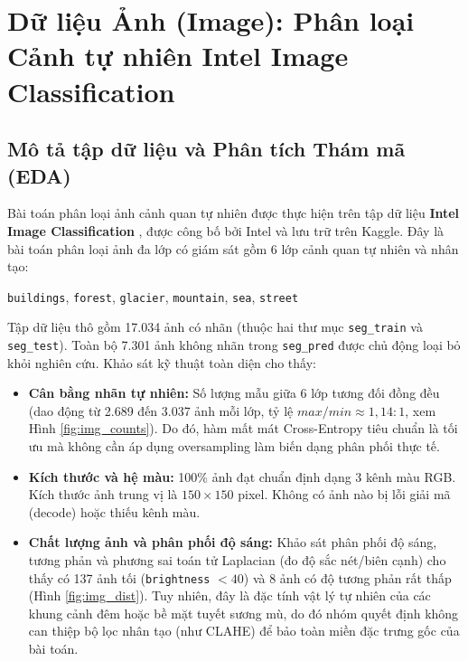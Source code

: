 \documentclass[a4paper,11pt]{article}
\begin{document}
\newpage
\section{Dữ liệu Ảnh (Image): Phân loại Cảnh tự nhiên Intel Image Classification}

\subsection{Mô tả tập dữ liệu và Phân tích Thám mã (EDA)}
Bài toán phân loại ảnh cảnh quan tự nhiên được thực hiện trên tập dữ liệu \textbf{Intel Image Classification} \cite{intel_dataset}, được công bố bởi Intel và lưu trữ trên Kaggle. Đây là bài toán phân loại ảnh đa lớp có giám sát gồm 6 lớp cảnh quan tự nhiên và nhân tạo:
\begin{center}
\texttt{buildings}, \texttt{forest}, \texttt{glacier}, \texttt{mountain}, \texttt{sea}, \texttt{street}
\end{center}

Tập dữ liệu thô gồm 17.034 ảnh có nhãn (thuộc hai thư mục \texttt{seg\_train} và \texttt{seg\_test}). Toàn bộ 7.301 ảnh không nhãn trong \texttt{seg\_pred} được chủ động loại bỏ khỏi nghiên cứu. Khảo sát kỹ thuật toàn diện cho thấy:
\begin{itemize}
    \item \textbf{Cân bằng nhãn tự nhiên:} Số lượng mẫu giữa 6 lớp tương đối đồng đều (dao động từ 2.689 đến 3.037 ảnh mỗi lớp, tỷ lệ $max/min \approx 1{,}14:1$, xem Hình \ref{fig:img_counts}). Do đó, hàm mất mát Cross-Entropy tiêu chuẩn là tối ưu mà không cần áp dụng oversampling làm biến dạng phân phối thực tế.
    \item \textbf{Kích thước và hệ màu:} 100\% ảnh đạt chuẩn định dạng 3 kênh màu RGB. Kích thước ảnh trung vị là $150 \times 150$ pixel. Không có ảnh nào bị lỗi giải mã (decode) hoặc thiếu kênh màu.
    \item \textbf{Chất lượng ảnh và phân phối độ sáng:} Khảo sát phân phối độ sáng, tương phản và phương sai toán tử Laplacian (đo độ sắc nét/biên cạnh) cho thấy có 137 ảnh tối (\texttt{brightness} $< 40$) và 8 ảnh có độ tương phản rất thấp (Hình \ref{fig:img_dist}). Tuy nhiên, đây là đặc tính vật lý tự nhiên của các khung cảnh đêm hoặc bề mặt tuyết sương mù, do đó nhóm quyết định không can thiệp bộ lọc nhân tạo (như CLAHE) để bảo toàn miền đặc trưng gốc của bài toán.
\end{itemize}
\end{document}
